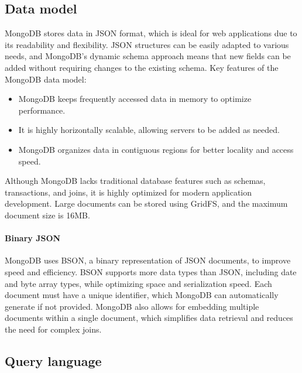 \subsection{Data model}
MongoDB stores data in JSON format, which is ideal for web applications due to its readability and flexibility. 
JSON structures can be easily adapted to various needs, and MongoDB's dynamic schema approach means that new fields can be added without requiring changes to the existing schema.
Key features of the MongoDB data model: 
\begin{itemize} 
    \item MongoDB keeps frequently accessed data in memory to optimize performance. 
    \item It is highly horizontally scalable, allowing servers to be added as needed. 
    \item MongoDB organizes data in contiguous regions for better locality and access speed.
\end{itemize}
Although MongoDB lacks traditional database features such as schemas, transactions, and joins, it is highly optimized for modern application development. 
Large documents can be stored using GridFS, and the maximum document size is 16MB.

\paragraph*{Binary JSON} 
MongoDB uses BSON, a binary representation of JSON documents, to improve speed and efficiency. 
BSON supports more data types than JSON, including date and byte array types, while optimizing space and serialization speed. 
Each document must have a unique identifier, which MongoDB can automatically generate if not provided.
MongoDB also allows for embedding multiple documents within a single document, which simplifies data retrieval and reduces the need for complex joins.














\subsection{Query language}